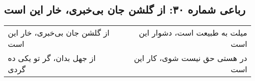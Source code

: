 \begin{center}
\section*{رباعی شماره ۳۰: از گلشن جان بی‌خبری، خار این است}
\label{sec:030}
\begin{longtable}{l p{0.5cm} r}
از گلشن جان بی‌خبری، خار این است
&&
میلت به طبیعت است، دشوار این است
\\
از جهل بدان، گر تو یکی ده گردی
&&
در هستی حق نیست شوی، کار این است
\\
\end{longtable}
\end{center}
